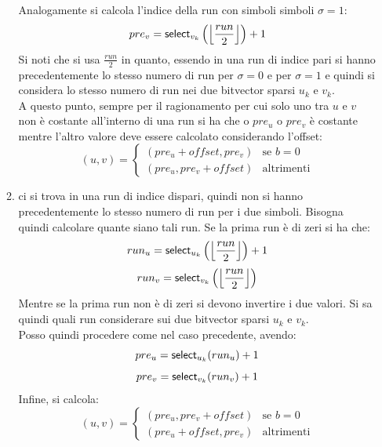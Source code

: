 \begin{enumerate}
\begin{enumerate}
    Analogamente si calcola l'indice della run con simboli simboli $\sigma=1$:
    \begin{equation}
      \label{eq:bv14}
      pre_v=\mbox{\rm {\sf select}}_{v_k}\left(\left\lfloor\frac{run}{2}\right\rfloor\right)+1
    \end{equation}
    Si noti che si usa $\frac{run}{2}$ in quanto, essendo in una run di indice
    pari si hanno precedentemente lo stesso numero di run per $\sigma=0$ e per
    $\sigma=1$ e quindi si considera lo stesso numero di run nei due
    bitvector sparsi $u_k$ e $v_k$.\\
    A questo punto, sempre per il ragionamento per cui solo uno tra $u$ e $v$
    non è costante all'interno di una run si ha che o $pre_u$ o $pre_v$ è
    costante mentre l'altro valore deve essere calcolato considerando l'offset:
    \begin{equation}
      \label{eq:bv15}
      (u,v)=
      \begin{cases}
        (pre_u+offset,pre_v)&\mbox{se } b=0\\
        (pre_u,pre_v+offset)&\mbox{altrimenti}
      \end{cases}
    \end{equation}
    \item ci si trova in una run di indice dispari, quindi non si hanno
    precedentemente lo stesso numero di run per i due simboli. Bisogna quindi
    calcolare quante siano tali run. Se la prima run è di zeri si ha che:
    \begin{equation}
      \label{eq:bv16}
      run_u=\mbox{\rm {\sf select}}_{u_k}\left(\left\lfloor\frac{run}{2}\right\rfloor\right)+1
    \end{equation}
    \begin{equation}
      \label{eq:bv17}
      run_v=\mbox{\rm {\sf select}}_{v_k}\left(\left\lfloor\frac{run}{2}\right\rfloor\right)
    \end{equation}
    Mentre se la prima run non è di zeri si devono invertire i due valori. Si
    sa 
    quindi quali run considerare sui due bitvector sparsi $u_k$ e
    $v_k$.\\ 
    Posso quindi procedere come nel caso precedente, avendo:
    \begin{equation}
      \label{eq:bv18}
      pre_u=\mbox{\rm {\sf select}}_{u_k}(run_u)+1
    \end{equation}
    \begin{equation}
      \label{eq:bv19}
      pre_v=\mbox{\rm {\sf select}}_{v_k}(run_v)+1
    \end{equation}
    Infine, si calcola:
    \begin{equation}
      \label{eq:bv20}
      (u,v)=
      \begin{cases}
        (pre_u,pre_v+offset)&\mbox{se } b=0\\
        (pre_u+offset,pre_v)&\mbox{altrimenti}
      \end{cases}
    \end{equation}
  \end{enumerate}
\end{enumerate}
